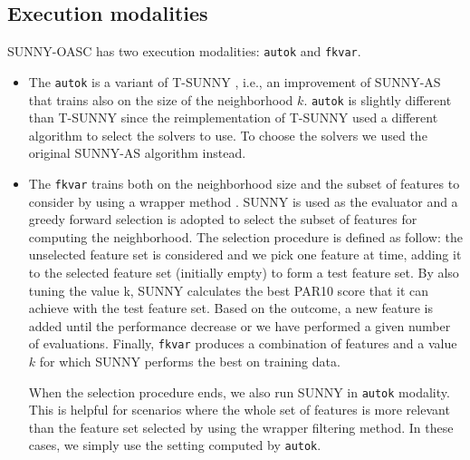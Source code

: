 \documentclass[tablecaption=bottom,wcp]{jmlr} %
\begin{document}


\subsection{Execution modalities}

SUNNY-OASC has two execution modalities: \texttt{autok} and 
\texttt{fkvar}.

\begin{itemize}
\item The \texttt{autok} is a variant of T-SUNNY \cite{DBLP:conf/lion/LindauerBH16}, 
i.e., an improvement of SUNNY-AS that trains also on the size of the neighborhood 
$k$. \texttt{autok} is slightly different than T-SUNNY since the 
reimplementation of T-SUNNY used a different algorithm to select the 
solvers to use. To choose the solvers we used the original SUNNY-AS 
algorithm instead.


  \item The \texttt{fkvar} trains both on the neighborhood size and 
the subset of features to consider by using a wrapper method 
\citep{Kohavi97wrappersfor}. SUNNY is used as the evaluator and a 
greedy forward selection is adopted to select the subset of features for 
computing the neighborhood.
% 
The selection procedure is defined as follow: 
the unselected feature set is considered and we pick one feature at time, 
adding it to the selected feature set (initially empty) to form a test 
feature set. By also tuning the value k, SUNNY calculates the best PAR10 score 
that it can achieve with the test feature set. Based on the outcome, a new 
feature is added until the performance decrease or we have performed a given 
number of evaluations. Finally, \texttt{fkvar} 
produces a combination of features and a value $k$ for which SUNNY performs the 
best on training data.

When the selection procedure ends, we also run SUNNY in %
\texttt{autok} modality. This is helpful
for scenarios where the whole set of features is more relevant than the 
feature set selected by using the wrapper filtering method. 
In these cases, we simply use the setting computed by \texttt{autok}.
\end{itemize}
 
\end{document}
